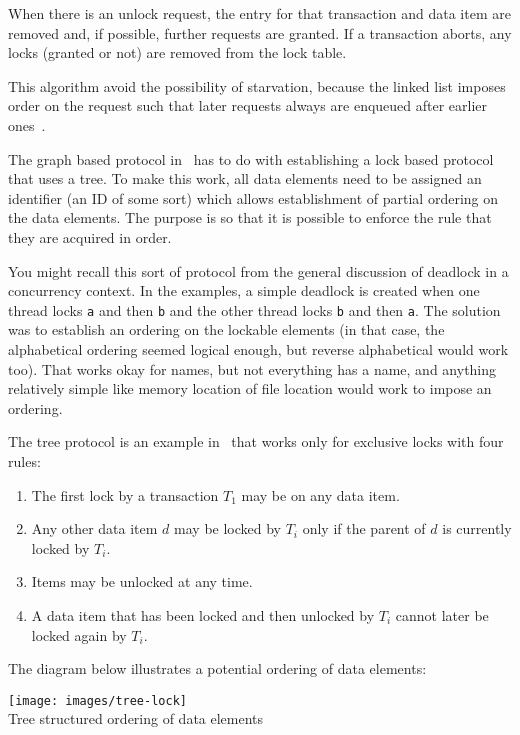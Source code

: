 When there is an unlock request, the entry for that transaction and data item are removed and, if possible, further requests are granted. If a transaction aborts, any locks (granted or not) are removed from the lock table.

This algorithm avoid the possibility of starvation, because the linked list imposes order on the request such that later requests always are enqueued after earlier ones~\cite{dsc}.

The graph based protocol in~\cite{dsc} has to do with establishing a lock based protocol that uses a tree. To make this work, all data elements need to be assigned an identifier (an ID of some sort) which allows establishment of partial ordering on the data elements. The purpose is so that it is possible to enforce the rule that they are acquired in order.

You might recall this sort of protocol from the general discussion of deadlock in a concurrency context. In the examples, a simple deadlock is created when one thread locks \texttt{a} and then \texttt{b} and the other thread locks \texttt{b} and then \texttt{a}. The solution was to establish an ordering on the lockable elements (in that case, the alphabetical ordering seemed logical enough, but reverse alphabetical would work too). That works okay for names, but not everything has a name, and anything relatively simple like memory location of file location would work to impose an ordering.

The tree protocol is an example in~\cite{dsc} that works only for exclusive locks with four rules:

\begin{enumerate}
	\item The first lock by a transaction $T_{1}$ may be on any data item.
	\item Any other data item $d$ may be locked by $T_{i}$ only if the parent of $d$ is currently locked by $T_{i}$.
	\item Items may be unlocked at any time.
	\item A data item that has been locked and then unlocked by $T_{i}$ cannot later be locked again by $T_{i}$.
\end{enumerate}

The diagram below illustrates a potential ordering of data elements:

\begin{center}
\texttt{[image: images/tree-lock]}\\
Tree structured ordering of data elements~\cite{dsc}
\end{center}

